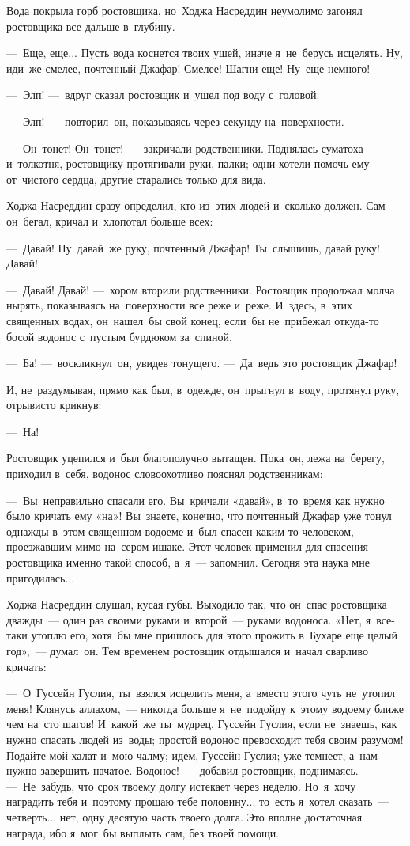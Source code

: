 \documentclass[12pt,a4paper]{book}
\begin{document}
Вода покрыла горб ростовщика, но~Ходжа Насреддин неумолимо загонял ростовщика все дальше в~глубину.

—~Еще, еще... Пусть вода коснется твоих ушей, иначе я~не~берусь исцелять. Ну, иди~же смелее, почтенный Джафар! Смелее! Шагни еще! Ну~еще немного!

—~Элп! —~вдруг сказал ростовщик и~ушел под воду с~головой.

—~Элп! —~повторил~он, показываясь через секунду на~поверхности.

—~Он~тонет! Он~тонет! —~закричали родственники. Поднялась суматоха и~толкотня, ростовщику протягивали руки, палки; одни хотели помочь ему от~чистого сердца, другие старались только для вида.

Ходжа Насреддин сразу определил, кто из~этих людей и~сколько должен. Сам он~бегал, кричал и~хлопотал больше всех:

—~Давай! Ну~давай~же руку, почтенный Джафар! Ты~слышишь, давай руку! Давай!

—~Давай! Давай! —~хором вторили родственники. Ростовщик продолжал молча нырять, показываясь на~поверхности все реже и~реже. И~здесь, в~этих священных водах, он~нашел~бы свой конец, если~бы не~прибежал откуда-то босой водонос с~пустым бурдюком за~спиной.

—~Ба! —~воскликнул~он, увидев тонущего. —~Да~ведь это ростовщик Джафар!

И, не~раздумывая, прямо как был, в~одежде, он~прыгнул в~воду, протянул руку, отрывисто крикнув:

—~На!

Ростовщик уцепился и~был благополучно вытащен. Пока~он, лежа на~берегу, приходил в~себя, водонос словоохотливо пояснял родственникам:

—~Вы~неправильно спасали его. Вы~кричали «давай», в~то~время как нужно было кричать ему «на»! Вы~знаете, конечно, что почтенный Джафар уже тонул однажды в~этом священном водоеме и~был спасен каким-то человеком, проезжавшим мимо на~сером ишаке. Этот человек применил для спасения ростовщика именно такой способ, а~я~— запомнил. Сегодня эта наука мне пригодилась...

Ходжа Насреддин слушал, кусая губы. Выходило так, что он~спас ростовщика дважды~— один раз своими руками и~второй~— руками водоноса. «Нет, я~все-таки утоплю его, хотя~бы мне пришлось для этого прожить в~Бухаре еще целый год»,~— думал~он. Тем временем ростовщик отдышался и~начал сварливо кричать:

—~О~Гуссейн Гуслия, ты~взялся исцелить меня, а~вместо этого чуть не~утопил меня! Клянусь аллахом,~— никогда больше я~не~подойду к~этому водоему ближе чем на~сто шагов! И~какой~же ты~мудрец, Гуссейн Гуслия, если не~знаешь, как нужно спасать людей из~воды; простой водонос превосходит тебя своим разумом! Подайте мой халат и~мою чалму; идем, Гуссейн Гуслия; уже темнеет, а~нам нужно завершить начатое. Водонос! —~добавил ростовщик, поднимаясь. —~Не~забудь, что срок твоему долгу истекает через неделю. Но~я~хочу наградить тебя и~поэтому прощаю тебе половину... то~есть я~хотел сказать~— четверть... нет, одну десятую часть твоего долга. Это вполне достаточная награда, ибо я~мог~бы выплыть сам, без твоей помощи.
\end{document}
